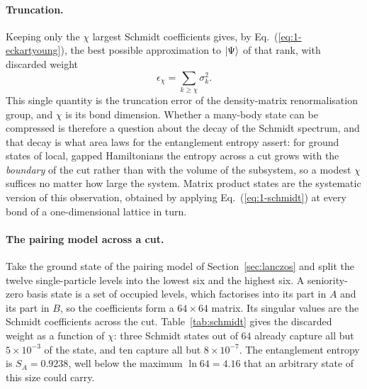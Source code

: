 \paragraph{Truncation.}
Keeping only the $\chi$ largest Schmidt coefficients gives, by
Eq.~(\ref{eq:1-eckartyoung}), the best possible approximation to
$\vert \Psi \rangle$ of that rank, with discarded weight
\begin{equation}
  \epsilon_{\chi} = \sum_{k\ge\chi}\sigma_k^2 .
  \label{eq:1-truncationerror}
\end{equation}
This single quantity is the truncation error of the density-matrix
renormalisation group, and $\chi$ is its bond dimension.  Whether a many-body
state can be compressed is therefore a question about the decay of the Schmidt
spectrum, and that decay is what area laws for the entanglement entropy
assert: for ground states of local, gapped Hamiltonians the entropy across a
cut grows with the \emph{boundary} of the cut rather than with the volume of
the subsystem, so a modest $\chi$ suffices no matter how large the system.
Matrix product states are the systematic version of this observation, obtained
by applying Eq.~(\ref{eq:1-schmidt}) at every bond of a one-dimensional
lattice in turn.

\paragraph{The pairing model across a cut.}
Take the ground state of the pairing model of Section~\ref{sec:lanczos} and
split the twelve single-particle levels into the lowest six and the highest
six.  A seniority-zero basis state is a set of occupied levels, which
factorises into its part in $A$ and its part in $B$, so the coefficients form
a $64\times64$ matrix.  Its singular values are the Schmidt coefficients
across the cut.  Table~\ref{tab:schmidt} gives the discarded weight as a
function of $\chi$: three Schmidt states out of $64$ already capture all but
$5\times10^{-3}$ of the state, and ten capture all but $8\times10^{-7}$.  The
entanglement entropy is $S_A=0.9238$, well below the maximum $\ln 64=4.16$
that an arbitrary state of this size could carry.

